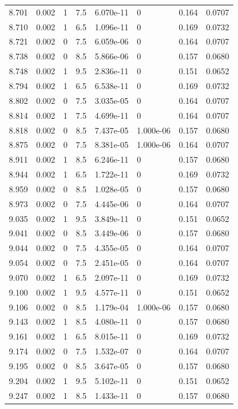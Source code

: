 \documentclass[preview]{standalone}
\begin{document}
{{{{{{{{{{\begin{tabular}{L{1.2cm}C{1.2cm} C{0.3cm}C{0.5cm} C{1.4cm}C{1.4cm} C{1.4cm}C{1.4cm}}
  8.701  &  0.002  & 1     & 7.5 &  6.070e-11  & 0  & 0.164 &  0.0707   \\ 
  8.710  &  0.002  & 1     & 6.5 &  1.096e-11  & 0  & 0.169 &  0.0732   \\ 
  8.721  &  0.002  & 0     & 7.5 &  6.059e-06  & 0  & 0.164 &  0.0707   \\ 
  8.738  &  0.002  & 0     & 8.5 &  5.866e-06  & 0  & 0.157 &  0.0680   \\ 
  8.748  &  0.002  & 1     & 9.5 &  2.836e-11  & 0  & 0.151 &  0.0652   \\ 
  8.794  &  0.002  & 1     & 6.5 &  6.538e-11  & 0  & 0.169 &  0.0732   \\ 
  8.802  &  0.002  & 0     & 7.5 &  3.035e-05  & 0  & 0.164 &  0.0707   \\ 
  8.814  &  0.002  & 1     & 7.5 &  4.699e-11  & 0  & 0.164 &  0.0707   \\ 
  8.818  &  0.002  & 0     & 8.5 &  7.437e-05  & 1.000e-06  & 0.157 &  0.0680   \\ 
  8.875  &  0.002  & 0     & 7.5 &  8.381e-05  & 1.000e-06  & 0.164 &  0.0707   \\ 
  8.911  &  0.002  & 1     & 8.5 &  6.246e-11  & 0  & 0.157 &  0.0680   \\ 
  8.944  &  0.002  & 1     & 6.5 &  1.722e-11  & 0  & 0.169 &  0.0732   \\ 
  8.959  &  0.002  & 0     & 8.5 &  1.028e-05  & 0  & 0.157 &  0.0680   \\ 
  8.973  &  0.002  & 0     & 7.5 &  4.445e-06  & 0  & 0.164 &  0.0707   \\ 
  9.035  &  0.002  & 1     & 9.5 &  3.849e-11  & 0  & 0.151 &  0.0652   \\ 
  9.041  &  0.002  & 0     & 8.5 &  3.449e-06  & 0  & 0.157 &  0.0680   \\ 
  9.044  &  0.002  & 0     & 7.5 &  4.355e-05  & 0  & 0.164 &  0.0707   \\ 
  9.054  &  0.002  & 0     & 7.5 &  2.451e-05  & 0  & 0.164 &  0.0707   \\ 
  9.070  &  0.002  & 1     & 6.5 &  2.097e-11  & 0  & 0.169 &  0.0732   \\ 
  9.100  &  0.002  & 1     & 9.5 &  4.577e-11  & 0  & 0.151 &  0.0652   \\ 
  9.106  &  0.002  & 0     & 8.5 &  1.179e-04  & 1.000e-06  & 0.157 &  0.0680   \\ 
  9.143  &  0.002  & 1     & 8.5 &  4.080e-11  & 0  & 0.157 &  0.0680   \\ 
  9.161  &  0.002  & 1     & 6.5 &  8.015e-11  & 0  & 0.169 &  0.0732   \\ 
  9.174  &  0.002  & 0     & 7.5 &  1.532e-07  & 0  & 0.164 &  0.0707   \\ 
  9.195  &  0.002  & 0     & 8.5 &  3.647e-05  & 0  & 0.157 &  0.0680   \\ 
  9.204  &  0.002  & 1     & 9.5 &  5.102e-11  & 0  & 0.151 &  0.0652   \\ 
  9.247  &  0.002  & 1     & 8.5 &  1.433e-11  & 0  & 0.157 &  0.0680   \\ 
\hline 
\end{tabular} 

}}}}}}}}}}
\end{document}
